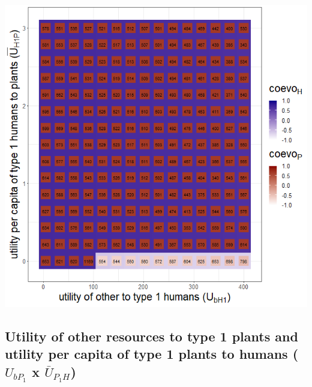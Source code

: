 \documentclass[
]{book}
\begin{document}

\includegraphics[width=1\linewidth]{plots/3_exp_type_1_humans_traits-tripleRaster_twoParameters}

\newpage

\hypertarget{utility-of-other-resources-to-type-1-plants-and-utility-per-capita-of-type-1-plants-to-humans-u_bp_1-x-baru_p_1h}{%
\subsection{\texorpdfstring{Utility of other resources to type 1 plants and utility per capita of type 1 plants to humans (\(U_{bP_{1}}\) x \(\bar{U}_{P_{1}H}\))}{Utility of other resources to type 1 plants and utility per capita of type 1 plants to humans (U\_\{bP\_\{1\}\} x \textbackslash bar\{U\}\_\{P\_\{1\}H\})}}\label{utility-of-other-resources-to-type-1-plants-and-utility-per-capita-of-type-1-plants-to-humans-u_bp_1-x-baru_p_1h}}
\end{document}
